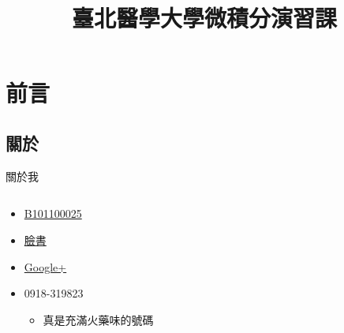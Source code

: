 \documentclass{Slideshow}
\begin{document}
\title[微積分演習課]{臺北醫學大學微積分演習課}
\maketitle

\section{前言}
\subsection{關於}
\begin{frame}{關於我}
    \begin{columns}[onlytextwidth]
        \begin{column}{0.6\textwidth}
            \begin{itemize}
                \item \href{http://my2.tmu.edu.tw/b101100025}{B101100025}
                \item \href{https://www.facebook.com/jdh863}{臉書}
                \item \href{https://plus.google.com/+\%E4\%BD\%95\%E9\%9C\%87\%E9\%82\%A6-jdh8}{Google+}
                \item 0918-319823
                    \begin{itemize}
                        \item 真是充滿火藥味的號碼
                    \end{itemize}
            \end{itemize}
        \end{column}


\end{columns}
\end{frame}
\end{document}
